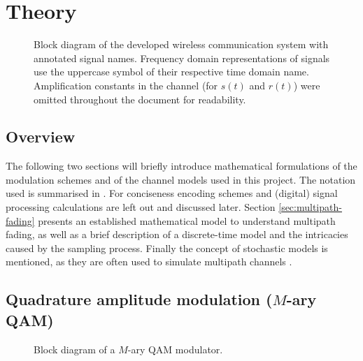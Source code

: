 
\chapter{Theory} \label{chp:theory}

\begin{figure}
	\centering
	\resizebox{.9\linewidth}{!}{
		
	}
	\caption{
		Block diagram of the developed wireless communication system with annotated signal names. Frequency domain representations of signals use the uppercase symbol of their respective time domain name. Amplification constants in the channel (for \(s(t)\) and \(r(t)\)) were omitted throughout the document for readability.
		\label{fig:notation}
	}
\end{figure}

\section{Overview}

The following two sections will briefly introduce mathematical formulations of the modulation schemes and of the channel models used in this project. The notation used is summarised in . For conciseness encoding schemes and (digital) signal processing calculations are left out and discussed later.  Section \ref{sec:multipath-fading} presents an established mathematical model to understand multipath fading, as well as a brief description of a discrete-time model and the intricacies caused by the sampling process. Finally the concept of stochastic models is mentioned, as they are often used to simulate multipath channels \cite{Messier,Mathis}.


\section{Quadrature amplitude modulation (\(M\)-ary QAM)}

\begin{figure}
	\centering
	\resizebox{\linewidth}{!}{
		
	}
	\caption{
		Block diagram of a \(M\)-ary QAM modulator.
		\label{fig:quadrature-modulation}
	}
\end{figure}

